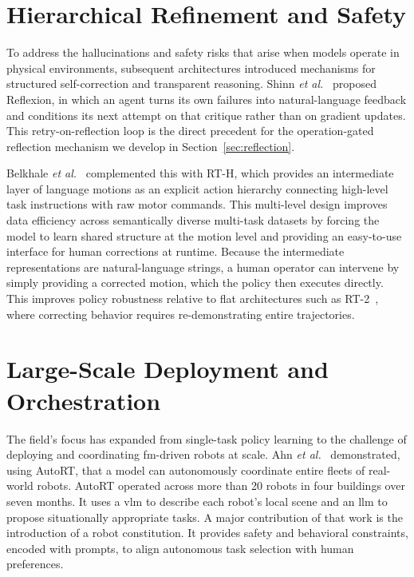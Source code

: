 \section{Hierarchical Refinement and Safety}\label{sec:refinement_and_safety}
To address the hallucinations and safety risks that arise when models operate in physical environments, subsequent architectures introduced mechanisms for structured self-correction and transparent reasoning. Shinn \emph{et al.}~\cite{shinn2023reflexionlanguageagentsverbal} proposed Reflexion, in which an agent turns its own failures into natural-language feedback and conditions its next attempt on that critique rather than on gradient updates. This retry-on-reflection loop is the direct precedent for the operation-gated reflection mechanism we develop in Section~\ref{sec:reflection}.

Belkhale \emph{et al.}~\cite{belkhale2024rthactionhierarchiesusing} complemented this with RT-H, which provides an intermediate layer of language motions as an explicit action hierarchy connecting high-level task instructions with raw motor commands. This multi-level design improves data efficiency across semantically diverse multi-task datasets by forcing the model to learn shared structure at the motion level and providing an easy-to-use interface for human corrections at runtime. Because the intermediate representations are natural-language strings, a human operator can intervene by simply providing a corrected motion, which the policy then executes directly. This improves policy robustness relative to flat architectures such as RT-2~\cite{brohan2023rt2visionlanguageactionmodelstransfer}, where correcting behavior requires re-demonstrating entire trajectories.

\section{Large-Scale Deployment and Orchestration}
The field’s focus has expanded from single-task policy learning to the challenge of deploying and coordinating \gls{fm}-driven robots at scale. Ahn \emph{et al.}~\cite{ahn2024autortembodiedfoundationmodels} demonstrated, using AutoRT, that a model can autonomously coordinate entire fleets of real-world robots. AutoRT operated across more than 20 robots in four buildings over seven months. It uses a \gls{vlm} to describe each robot’s local scene and an \gls{llm} to propose situationally appropriate tasks. A major contribution of that work is the introduction of a robot constitution. It provides safety and behavioral constraints, encoded with prompts, to align autonomous task selection with human preferences.

